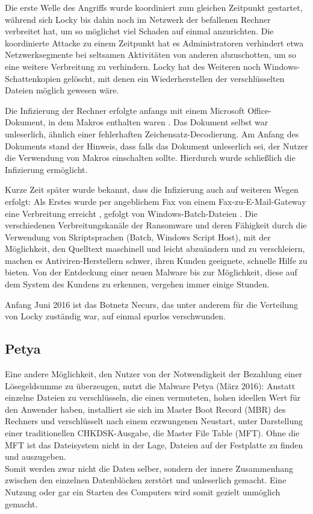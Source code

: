 Die erste Welle des Angriffs wurde koordiniert zum gleichen Zeitpunkt gestartet, während sich Locky bis dahin noch im Netzwerk der befallenen Rechner verbreitet hat, um so möglichst viel Schaden auf einmal anzurichten. Die koordinierte Attacke zu einem Zeitpunkt hat es Administratoren verhindert etwa Netzwerksegmente bei seltsamen Aktivitäten von anderen abzuschotten, um so eine weitere Verbreitung zu verhindern. Locky hat des Weiteren noch Windows-Schattenkopien gelöscht, mit denen ein Wiederherstellen der verschlüsselten Dateien möglich gewesen wäre. \cite{locky:start}

Die Infizierung der Rechner erfolgte anfangs mit einem Microsoft Office-Dokument, in dem Makros enthalten waren \cite{locky:infection}. Das Dokument selbst war unleserlich, ähnlich einer fehlerhaften Zeichensatz-Decodierung. Am Anfang des Dokuments stand der Hinweis, dass falls das Dokument unleserlich sei, der Nutzer die Verwendung von Makros einschalten sollte. Hierdurch wurde schließlich die Infizierung ermöglicht.

Kurze Zeit später wurde bekannt, dass die Infizierung auch auf weiteren Wegen erfolgt: Als Erstes wurde per angeblichem Fax von einem Fax-zu-E-Mail-Gateway eine Verbreitung erreicht \cite{locky:fax}, gefolgt von Windows-Batch-Dateien \cite{locky:batch}. Die verschiedenen Verbreitungskanäle der Ransomware und deren Fähigkeit durch die Verwendung von Skriptsprachen (Batch, Windows Script Host), mit der Möglichkeit, den Quelltext maschinell und leicht abzuändern und zu verschleiern, machen es Antiviren-Herstellern schwer, ihren Kunden geeignete, schnelle Hilfe zu bieten. Von der Entdeckung einer neuen Malware bis zur Möglichkeit, diese auf dem System des Kundens zu erkennen, vergehen immer einige Stunden.

Anfang Juni 2016 ist das Botnetz \glqq Necurs\grqq, das unter anderem für die Verteilung von Locky zuständig war, auf einmal spurlos verschwunden. \cite{locky:end}

		
\subsection{Petya}
Eine andere Möglichkeit, den Nutzer von der Notwendigkeit der Bezahlung einer Lösegeldsumme zu überzeugen, nutzt die Malware \glqq Petya\grqq{} (März 2016): Anstatt einzelne Dateien zu verschlüsseln, die einen vermuteten, hohen ideellen Wert für den Anwender haben, installiert sie sich im Master Boot Record (MBR) des Rechners und verschlüsselt nach einem erzwungenen Neustart, unter Darstellung einer traditionellen CHKDSK-Ausgabe, die Master File Table (MFT). Ohne die MFT ist das Dateisystem nicht in der Lage, Dateien auf der Festplatte zu finden und auszugeben. \cite{petya:start} \\
Somit werden zwar nicht die Daten selber, sondern der innere Zusammenhang zwischen den einzelnen Datenblöcken zerstört und unleserlich gemacht. Eine Nutzung oder gar ein Starten des Computers wird somit gezielt unmöglich gemacht.

